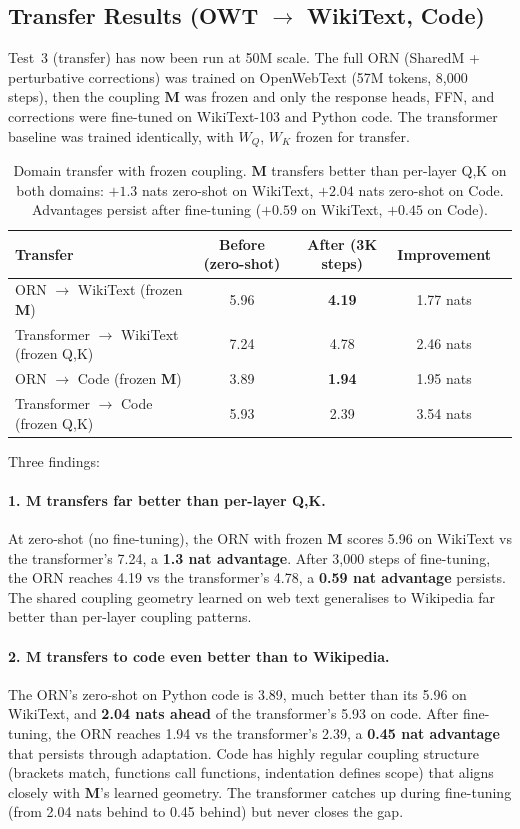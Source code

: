 \documentclass[11pt, a4paper]{article}
\newcommand{\M}{\mathbf{M}}
\theoremstyle{remark}
\begin{document}
\subsection{Transfer Results (OWT $\to$ WikiText, Code)}

Test~3 (transfer) has now been run at 50M scale.
The full ORN (SharedM + perturbative corrections) was trained on OpenWebText (57M tokens, 8{,}000 steps), then the coupling $\M$ was frozen and only the response heads, FFN, and corrections were fine-tuned on WikiText-103 and Python code.
The transformer baseline was trained identically, with $W_Q$, $W_K$ frozen for transfer.

\begin{table}[h]
\centering\small
\begin{tabular}{@{}lcccc@{}}
\toprule
\textbf{Transfer} & \textbf{Before (zero-shot)} & \textbf{After (3K steps)} & \textbf{Improvement} \\
\midrule
ORN $\to$ WikiText (frozen $\M$) & 5.96 & \textbf{4.19} & 1.77 nats \\
Transformer $\to$ WikiText (frozen Q,K) & 7.24 & 4.78 & 2.46 nats \\
\midrule
ORN $\to$ Code (frozen $\M$) & 3.89 & \textbf{1.94} & 1.95 nats \\
Transformer $\to$ Code (frozen Q,K) & 5.93 & 2.39 & 3.54 nats \\
\bottomrule
\end{tabular}
\caption{Domain transfer with frozen coupling. $\M$ transfers better than per-layer Q,K on both domains: $+1.3$ nats zero-shot on WikiText, $+2.04$ nats zero-shot on Code. Advantages persist after fine-tuning ($+0.59$ on WikiText, $+0.45$ on Code).}
\end{table}

Three findings:

\paragraph{1. $\M$ transfers far better than per-layer Q,K.}
At zero-shot (no fine-tuning), the ORN with frozen $\M$ scores 5.96 on WikiText vs the transformer's 7.24, a \textbf{1.3 nat advantage}.
After 3{,}000 steps of fine-tuning, the ORN reaches 4.19 vs the transformer's 4.78, a \textbf{0.59 nat advantage} persists.
The shared coupling geometry learned on web text generalises to Wikipedia far better than per-layer coupling patterns.

\paragraph{2. $\M$ transfers to code even better than to Wikipedia.}
The ORN's zero-shot on Python code is 3.89, much better than its 5.96 on WikiText, and \textbf{2.04 nats ahead} of the transformer's 5.93 on code.
After fine-tuning, the ORN reaches 1.94 vs the transformer's 2.39, a \textbf{0.45 nat advantage} that persists through adaptation.
Code has highly regular coupling structure (brackets match, functions call functions, indentation defines scope) that aligns closely with $\M$'s learned geometry.
The transformer catches up during fine-tuning (from 2.04 nats behind to 0.45 behind) but never closes the gap.
\end{document}
